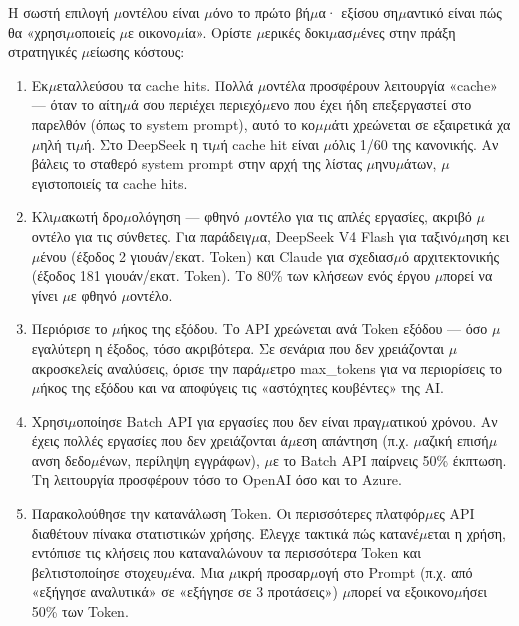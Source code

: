 Η σωστή επιλογή $\mu$οντέλου είναι $\mu$όνο το πρώτο βή$\mu$α· εξίσου ση$\mu$αντικό είναι πώς θα «χρησι$\mu$οποιείς $\mu$ε οικονο$\mu$ία». Ορίστε $\mu$ερικές δοκι$\mu$ασ$\mu$ένες στην πράξη στρατηγικές $\mu$είωσης κόστους:

\begin{enumerate}
  \item Εκ$\mu$εταλλεύσου τα cache hits. Πολλά $\mu$οντέλα προσφέρουν λειτουργία «cache» — όταν το αίτη$\mu$ά σου περιέχει περιεχό$\mu$ενο που έχει ήδη επεξεργαστεί στο παρελθόν (όπως το system prompt), αυτό το κο$\mu$$\mu$άτι χρεώνεται σε εξαιρετικά χα$\mu$ηλή τι$\mu$ή. Στο DeepSeek η τι$\mu$ή cache hit είναι $\mu$όλις 1/60 της κανονικής. Αν βάλεις το σταθερό system prompt στην αρχή της λίστας $\mu$ηνυ$\mu$άτων, $\mu$εγιστοποιείς τα cache hits.
  \item Κλι$\mu$ακωτή δρο$\mu$ολόγηση — φθηνό $\mu$οντέλο για τις απλές εργασίες, ακριβό $\mu$οντέλο για τις σύνθετες. Για παράδειγ$\mu$α, DeepSeek V4 Flash για ταξινό$\mu$ηση κει$\mu$ένου (έξοδος 2 γιουάν/εκατ. Token) και Claude για σχεδιασ$\mu$ό αρχιτεκτονικής (έξοδος 181 γιουάν/εκατ. Token). Το 80\% των κλήσεων ενός έργου $\mu$πορεί να γίνει $\mu$ε φθηνό $\mu$οντέλο.
  \item Περιόρισε το $\mu$ήκος της εξόδου. Το API χρεώνεται ανά Token εξόδου — όσο $\mu$εγαλύτερη η έξοδος, τόσο ακριβότερα. Σε σενάρια που δεν χρειάζονται $\mu$ακροσκελείς αναλύσεις, όρισε την παρά$\mu$ετρο max\_tokens για να περιορίσεις το $\mu$ήκος της εξόδου και να αποφύγεις τις «αστόχητες κουβέντες» της AI.
  \item Χρησι$\mu$οποίησε Batch API για εργασίες που δεν είναι πραγ$\mu$ατικού χρόνου. Αν έχεις πολλές εργασίες που δεν χρειάζονται ά$\mu$εση απάντηση (π.χ. $\mu$αζική επισή$\mu$ανση δεδο$\mu$ένων, περίληψη εγγράφων), $\mu$ε το Batch API παίρνεις 50\% έκπτωση. Τη λειτουργία προσφέρουν τόσο το OpenAI όσο και το Azure.
  \item Παρακολούθησε την κατανάλωση Token. Οι περισσότερες πλατφόρ$\mu$ες API διαθέτουν πίνακα στατιστικών χρήσης. Έλεγχε τακτικά πώς κατανέ$\mu$εται η χρήση, εντόπισε τις κλήσεις που καταναλώνουν τα περισσότερα Token και βελτιστοποίησε στοχευ$\mu$ένα. Μια $\mu$ικρή προσαρ$\mu$ογή στο Prompt (π.χ. από «εξήγησε αναλυτικά» σε «εξήγησε σε 3 προτάσεις») $\mu$πορεί να εξοικονο$\mu$ήσει 50\% των Token.
\end{enumerate}

